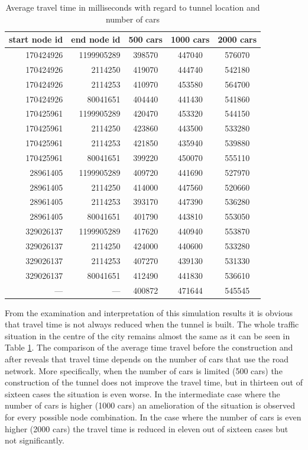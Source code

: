 \documentclass[11pt]{article}
\begin{document}
\begin{table}[tb]
	\caption{Average travel time in milliseconds with regard to tunnel location and number of cars}
	\label{tab:times}
	\begin{center}
		\begin{tabular}{rrccc}
		\toprule
		start node id & end node id & 500 cars & 1000 cars & 2000 cars \\
		\midrule
			170424926 & 1199905289 & 398570 & 447040 & 576070 \\
			170424926 & 2114250 & 419070 & 444740 & 542180 \\
			170424926 & 2114253 & 410970 & 453580 & 564700 \\
			170424926 & 80041651 & 404440 & 441430 & 541860 \\
			170425961 & 1199905289 & 420470 & 453320 & 544150 \\
			170425961 & 2114250 & 423860 & 443500 & 533280 \\
			170425961 & 2114253 & 421850 & 435940 & 539880 \\
			170425961 & 80041651 & 399220 & 450070 & 555110 \\
			28961405 & 1199905289 & 409720 & 441690 & 527970 \\
			28961405 & 2114250 & 414000 & 447560 & 520660 \\
			28961405 & 2114253 & 393170 & 447390 & 536280 \\
			28961405 & 80041651 & 401790 & 443810 & 553050 \\
			329026137 & 1199905289 & 417620 & 440940 & 553870 \\
			329026137 & 2114250 & 424000 & 440600 & 533280 \\
			329026137 & 2114253 & 407270 & 439130 & 531330 \\
			329026137 & 80041651 & 412490 & 441830 & 536610 \\
			--- & --- & 400872 & 471644 & 545545 \\
		\bottomrule
		\end{tabular}
	\end{center}
\end{table}

From the examination and interpretation of this simulation results it is obvious that travel time is not always reduced when the tunnel is built. The whole traffic situation in the centre of the city remains almost the same as it can be seen in Table \ref{tab:times}. The comparison of the average time travel before the construction and after reveals that travel time depends on the number of cars that use the road network. More specifically, when the number of cars is limited (500 cars) the construction of the tunnel does not improve the travel time, but in thirteen out of sixteen cases the situation is even worse. In the intermediate case where the number of cars is higher (1000 cars) an amelioration of the situation is observed for every possible node combination. In the case where the number of cars is even higher (2000 cars) the travel time is reduced in eleven out of sixteen cases but not significantly.
\end{document}
